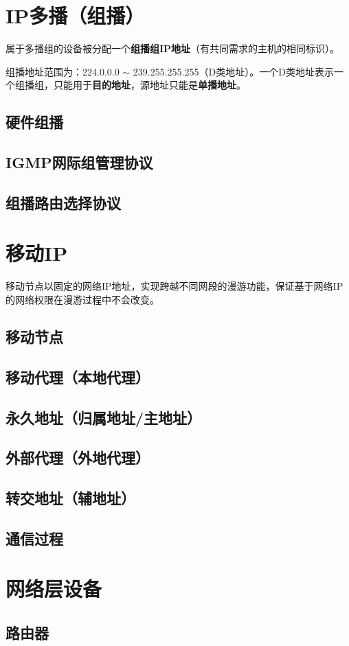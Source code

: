 \section{IP多播（组播）}
属于多播组的设备被分配一个\textbf{组播组IP地址}（有共同需求的主机的相同标识）。

组播地址范围为：224.0.0.0 \(\sim\) 239.255.255.255（D类地址）。一个D类地址表示一个组播组，只能用于\textbf{目的地址}，源地址只能是\textbf{单播地址}。

\subsection{硬件组播}


\subsection{IGMP网际组管理协议}


\subsection{组播路由选择协议}


\section{移动IP}
移动节点以固定的网络IP地址，实现跨越不同网段的漫游功能，保证基于网络IP的网络权限在漫游过程中不会改变。

\subsection{移动节点}


\subsection{移动代理（本地代理）}


\subsection{永久地址（归属地址/主地址）}


\subsection{外部代理（外地代理）}


\subsection{转交地址（辅地址）}


\subsection{通信过程}


\section{网络层设备}

\subsection{路由器}



